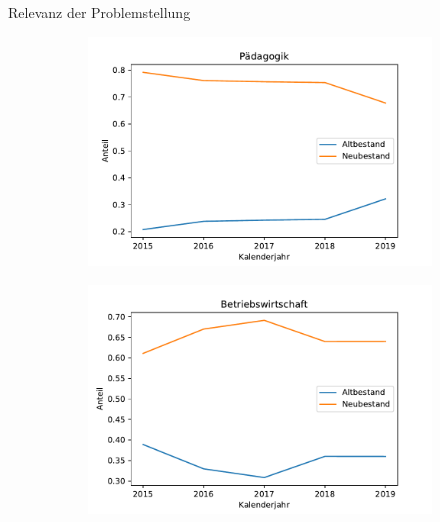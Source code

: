 \documentclass[17pt, fleqn]{beamer}
\begin{document}
\begin{frame}{Relevanz der Problemstellung}
    \begin{figure}[ht]
        
        \begin{subfigure}{0.49\textwidth}
            
            \includegraphics[width = 1\textwidth]{pad2.pdf}
        \end{subfigure}
        \begin{subfigure}{0.49\textwidth}
            
            \includegraphics[width = 1\textwidth]{bwl2.pdf}
        \end{subfigure}
        \begin{subfigure}{0.49\textwidth}
           

\end{subfigure}
\end{figure}
\end{frame}
\end{document}
